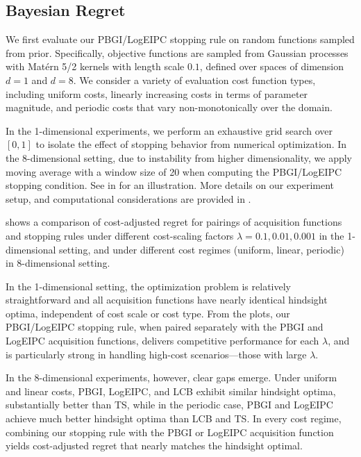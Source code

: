 \subsection{Bayesian Regret}
We first evaluate our PBGI/LogEIPC stopping rule on random functions sampled from prior. 
Specifically, objective functions are sampled from Gaussian processes with Matérn 5/2 kernels with length scale $0.1$, defined over spaces of dimension $d=1$ and $d=8$.
We consider a variety of evaluation cost function types, including uniform costs, linearly increasing costs in terms of parameter magnitude, and periodic costs that vary non-monotonically over the domain. 

In the 1-dimensional experiments, we perform an exhaustive grid search over $[0,1]$ to isolate the effect of stopping behavior from numerical optimization.
In the 8-dimensional setting, due to instability from higher dimensionality, we apply moving average with a window size of 20 when computing the PBGI/LogEIPC stopping condition. See  in  for an illustration.
More details on our experiment setup, and computational considerations are provided in .

 shows a comparison of cost-adjusted regret for pairings of acquisition functions and stopping rules under different cost-scaling factors $\lambda = 0.1, 0.01, 0.001$ in the 1-dimensional setting, and under different cost regimes (uniform, linear, periodic) in 8-dimensional setting. 

In the 1-dimensional setting, the optimization problem is relatively straightforward and all acquisition functions have nearly identical hindsight optima, independent of cost scale or cost type. From the plots, our PBGI/LogEIPC stopping rule, when paired separately with the PBGI and LogEIPC acquisition functions, delivers competitive performance for each $\lambda$, and is particularly strong in handling high-cost scenarios---those with large $\lambda$.

In the 8-dimensional experiments, however, clear gaps emerge. Under uniform and linear costs, PBGI, LogEIPC, and LCB exhibit similar hindsight optima, substantially better than TS, while in the periodic case, PBGI and LogEIPC achieve much better hindsight optima than LCB and TS. In every cost regime, combining our stopping rule with the PBGI  or LogEIPC acquisition function yields cost-adjusted regret that nearly matches the hindsight optimal. 

